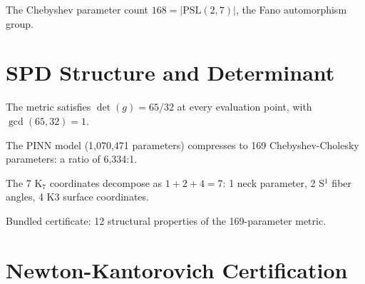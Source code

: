 \begin{theorem}[$168 = |\mathrm{PSL}(2,7)|$]\label{thm:168_PSL27}
    \leanok
    The Chebyshev parameter count $168 = |\mathrm{PSL}(2,7)|$, the Fano
    automorphism group.
\end{theorem}

\section{SPD Structure and Determinant}

\begin{theorem}[det$(g) = 65/32$]\label{thm:cholesky_det}
    \leanok
    The metric satisfies $\det(g) = 65/32$ at every evaluation point,
    with $\gcd(65, 32) = 1$.
\end{theorem}

\begin{theorem}\label{thm:pinn_compression}
    \leanok
    The PINN model (1,070,471 parameters) compresses to 169 Chebyshev-Cholesky
    parameters: a ratio of 6,334:1.
\end{theorem}

\begin{theorem}\label{thm:index_decomp}
    \leanok
    The 7 K$_7$ coordinates decompose as $1 + 2 + 4 = 7$:
    1 neck parameter, 2 S$^1$ fiber angles, 4 K3 surface coordinates.
\end{theorem}

\begin{theorem}\label{thm:explicit_g2_cert}
    \leanok
    Bundled certificate: 12 structural properties of the 169-parameter metric.
\end{theorem}

\section{Newton-Kantorovich Certification}

